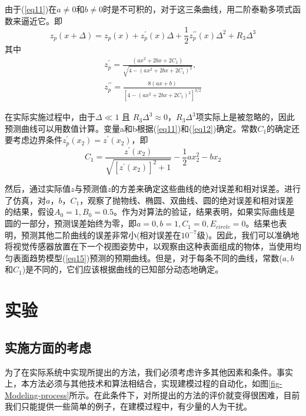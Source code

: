 \documentclass[AutoFakeBold,zihao=-4]{ctexart}
\begin{document}
	由于(\ref{eq11})在$ a \neq 0 $和$ b \neq 0 $时是不可积的，对于这三条曲线，用二阶泰勒多项式函数来逼近它。即
	\begin{equation*}
		z_{p}(x+\Delta)=z_{p}(x)+z_{p}^{\prime}(x) \Delta+\frac{1}{2} z_{p}^{\prime \prime}(x) \Delta^{2}+R_{3} \Delta^{3}
	\end{equation*}
	其中
	\begin{equation*}
		\begin{array}{l}
			z_{p}^{\prime}=\frac{\left(a x^{2}+2 b x+2 C_{1}\right)}{\sqrt{4-\left(a x^{2}+2 b x+2 C_{1}\right)^{2}}},  \\
			z_{p}^{\prime \prime}=\frac{8(a x+b)}{\left[4-\left(a x^{2}+2 b x+2 C_{1}\right)^{2}\right]^{3 / 2}}
		\end{array}
	\end{equation*}

	在实际实施过程中，由于$ \Delta \ll 1 $ 且 $ R_{3} \Delta^{3} \approx 0 $，$ R_{3} \Delta^{3} $项实际上是被忽略的，因此预测曲线可以用数值计算。变量a和b根据(\ref{eq11})和(\ref{eq12})确定。常数$ C_{1} $的确定还要考虑边界条件$ z_{p}^{\prime}\left(x_{2}\right)=z^{\prime}\left(x_{2}\right) $，即
	\begin{equation}
		C_{1}=\frac{z^{\prime}\left(x_{2}\right)}{\sqrt{\left[z^{\prime}\left(x_{2}\right)\right]^{2}+1}}-\frac{1}{2} a x_{2}^{2}-b x_{2}
		\label{eq26}
	\end{equation}

	然后，通过实际值$ z $与预测值$ z $的方差来确定这些曲线的绝对误差和相对误差。进行了仿真，对$ a，b，C_{1} $，观察了抛物线、椭圆、双曲线、圆的绝对误差和相对误差的结果，假设$ A_{0}=1, B_{0}=0.5 $。作为对算法的验证，结果表明，如果实际曲线是圆的一部分，预测误差始终为零，即$ a=0, b=1, C_{1}=0, E_{circle}=0 $。结果也表明，预测其他二阶曲线的误差非常小(相对误差在$ 10^{-7} $级)。因此，我们可以准确地将视觉传感器放置在下一个视图姿势中，以观察由这种表面组成的物体，当使用均匀表面趋势模型(\ref{eq15})预测的预期曲线。但是，对于每条不同的曲线，常数($ a, b$和$ C_{1} $)是不同的，它们应该根据曲线的已知部分动态地确定。
	
	\section{实验}
	\subsection{实施方面的考虑}
	为了在实际系统中实现所提出的方法，我们必须考虑许多其他因素和条件。事实上，本方法必须与其他技术和算法相结合，实现建模过程的自动化，如图\ref{fig-Modeling-process}所示。在此条件下，对所提出的方法的评价就变得很困难，目前我们只能提供一些简单的例子，在建模过程中，有少量的人为干扰。
	
\end{document}
